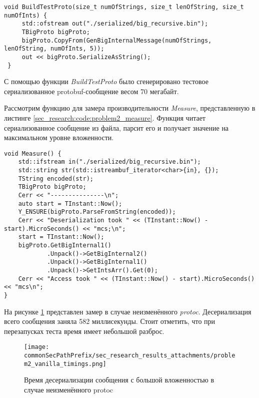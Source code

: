 \noindent\begin{minipage}{\linewidth}
\begin{lstlisting}[style=CodeListing, caption={Функция BuildTestProto}, label=sec_research:code:problem2_build_test_proto]
 void BuildTestProto(size_t numOfStrings, size_t lenOfString, size_t numOfInts) {
     std::ofstream out("./serialized/big_recursive.bin");
     TBigProto bigProto;
     bigProto.CopyFrom(GenBigInternalMessage(numOfStrings, lenOfString, numOfInts, 5));
     out << bigProto.SerializeAsString();
 }
\end{lstlisting}
\end{minipage}

С помощью функции \textit{BuildTestProto} было сгенерировано тестовое сериализованное protobuf-сообщение весом 70 мегабайт.

Рассмотрим функцию для замера производительности \textit{Measure}, представленную в листинге \ref{sec_research:code:problem2_measure}.
Функция читает сериализованное сообщение из файла, парсит его и получает значение на максимальном уровне вложенности.

\noindent\begin{minipage}{\linewidth}
\begin{lstlisting}[style=CodeListing, caption={Функция Measure}, label=sec_research:code:problem2_measure]
void Measure() {
    std::ifstream in("./serialized/big_recursive.bin");
    std::string str(std::istreambuf_iterator<char>{in}, {});
    TString encoded(str);
    TBigProto bigProto;
    Cerr << "---------------\n";
    auto start = TInstant::Now();
    Y_ENSURE(bigProto.ParseFromString(encoded));
    Cerr << "Deserialization took " << (TInstant::Now() - start).MicroSeconds() << "mcs;\n";
    start = TInstant::Now();
    bigProto.GetBigInternal1()
            .Unpack()->GetBigInternal2()
            .Unpack()->GetBigInternal1()
            .Unpack()->GetIntsArr().Get(0);
    Cerr << "Access took " << (TInstant::Now() - start).MicroSeconds() << "mcs\n";
}
\end{lstlisting}
\end{minipage}

На рисунке \ref{fig:problem2_vanilla_timings} представлен замер в случае неизменённого \textit{protoc}.
Десериализация всего сообщения заняла 582 миллисекунды. Стоит отметить, что при перезапусках теста время имеет небольшой разброс.

\begin{figure}[!ht]
    \centering
    \texttt{[image: \\commonSecPathPrefix/sec\_research\_results\_attachments/problem2\_vanilla\_timings.png]}
    \caption{Время десериализации сообщения с большой вложенностью в случае неизменённого protoc}
    \label{fig:problem2_vanilla_timings}
\end{figure}


